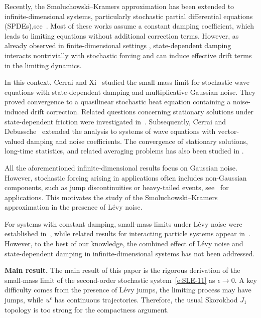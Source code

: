 \documentclass[11pt]{article}
\theoremstyle{plain}
\numberwithin{equation}{section}
\begin{document}
 

Recently, the Smoluchowski--Kramers approximation has been extended to infinite-dimensional systems, particularly stochastic partial differential
equations (SPDEs),see~\cite{SMM, SCMF, SM, rmt, L1, WWSCG}. Most of these works assume a constant damping coefficient, which leads to
limiting equations without additional correction terms. However, as already observed in finite-dimensional settings
\cite{Herzog, shamgv:smklim}, state-dependent damping interacts nontrivially with stochastic forcing and can induce effective drift terms in the limiting
dynamics.

In this context, Cerrai and Xi~\cite{SCGX} studied the small-mass limit for stochastic wave equations with state-dependent damping and multiplicative
Gaussian noise. They proved convergence to a quasilinear stochastic heat equation containing a noise-induced drift correction.
Related questions concerning stationary solutions under state-dependent friction were  investigated in~\cite{MXie}.
Subsequently, Cerrai and Debussche~\cite{SA} extended the analysis to systems of wave equations with vector-valued damping and noise coefficients.
The convergence of stationary solutions, long-time statistics, and related
averaging problems has also been studied in
\cite{Glatt-Holtz,Nguyen,WWjsp}.

All the aforementioned infinite-dimensional results focus on Gaussian noise. However, stochastic forcing arising in applications often includes non-Gaussian
components, such as jump discontinuities or heavy-tailed events, see~\cite{DD, DVYAV, DJQ, WAW} for applications.
This motivates the study of the Smoluchowski--Kramers approximation in the
presence of  L\'evy noise.

For systems with constant damping, small-mass limits under  L\'evy noise were
established in~\cite{zhangs}, while related results for interacting particle
systems appear in~\cite{wangzibo2}. However, to the best of our knowledge, the combined effect of  L\'evy noise and
state-dependent damping in infinite-dimensional systems has not been addressed.



\noindent\textbf{Main result.}
The main result of this paper is the rigorous derivation of the small-mass limit of the second-order stochastic system~\eqref{e:SLE-11} as
\(\epsilon\to0\). A key difficulty comes from the presence of L\'evy jumps, the limiting process may have jumps, while \(u^\epsilon\) has continuous
trajectories. Therefore, the usual Skorokhod \(J_1\) topology is too strong for the compactness argument.
\end{document}
